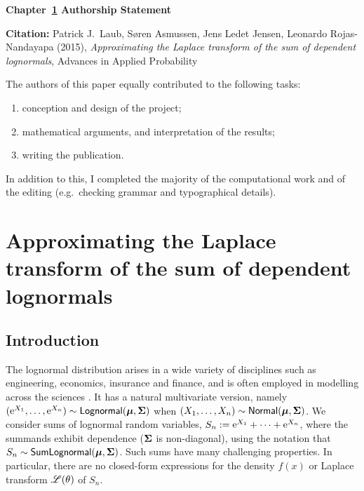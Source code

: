 \newpage


\vspace*{\fill}

{\large \bf Chapter~\ref{chp:Laplace} Authorship Statement}

\vspace{1em}

{\bf Citation:} Patrick J.\ Laub, S{\o}ren Asmussen, Jens Ledet Jensen, Leonardo Rojas-Nandayapa (2015), \emph{Approximating the Laplace transform of the sum of dependent lognormals}, Advances in Applied Probability

\vspace{1em}

The authors of this paper equally contributed to the following tasks:
\begin{enumerate}
\item conception and design of the project;
\item mathematical arguments, and interpretation of the results;
\item writing the publication.
\end{enumerate}

In addition to this, I completed the majority of the computational work and of the editing (e.g.\ checking grammar and typographical details).

\vspace{3em}

\vspace*{\fill}


\chapter{Approximating the Laplace transform of the sum of dependent lognormals} \label{chp:Laplace}

\section{Introduction}\label{S:Intro}

The lognormal distribution arises in a wide variety of disciplines such as
engineering, economics, insurance and finance, and is often employed in
modelling across the sciences
\cite{aitchison1957lognormal,crow1988lognormal,dufresne2008,
  johnson1994continuous,limpert2001log}. It
has a natural multivariate version, namely $(\mathrm{e}^{X_1}, \dots, \mathrm{e}^{X_n})
\sim \mathsf{Lognormal}(\bm{\mu}, \bm{\Sigma})$ when $(X_1, \dots, X_n) \sim \mathsf{Normal}(\bm{\mu},
\bm{\Sigma})$. We consider sums of lognormal random variables,
$S_n := \mathrm{e}^{X_1} + \cdots + \mathrm{e}^{X_n}$, where the summands exhibit
dependence ($\bm{\Sigma}$ is non-diagonal), using the notation that $S_n
\sim \mathsf{SumLognormal}(\bm{\mu}, \bm{\Sigma})$. Such sums have many challenging properties. In
particular, there are no closed-form expressions for the density $f(x)$ or
Laplace transform $\mathscr{L}(\theta)$ of $S_n$.

